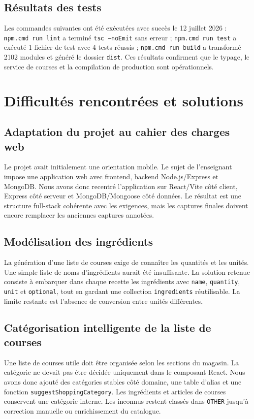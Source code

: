 \documentclass[12pt,a4paper]{report}
\begin{document}
\section{Résultats des tests}
Les commandes suivantes ont été exécutées avec succès le 12 juillet 2026 : \texttt{npm.cmd run lint} a terminé \texttt{tsc --noEmit} sans erreur ; \texttt{npm.cmd run test} a exécuté 1 fichier de test avec 4 tests réussis ; \texttt{npm.cmd run build} a transformé 2102 modules et généré le dossier \texttt{dist}. Ces résultats confirment que le typage, le service de courses et la compilation de production sont opérationnels.

\chapter{Difficultés rencontrées et solutions}
\section{Adaptation du projet au cahier des charges web}
Le projet avait initialement une orientation mobile. Le sujet de l'enseignant impose une application web avec frontend, backend Node.js/Express et MongoDB. Nous avons donc recentré l'application sur React/Vite côté client, Express côté serveur et MongoDB/Mongoose côté données. Le résultat est une structure full-stack cohérente avec les exigences, mais les captures finales doivent encore remplacer les anciennes captures annotées.

\section{Modélisation des ingrédients}
La génération d'une liste de courses exige de connaître les quantités et les unités. Une simple liste de noms d'ingrédients aurait été insuffisante. La solution retenue consiste à embarquer dans chaque recette les ingrédients avec \texttt{name}, \texttt{quantity}, \texttt{unit} et \texttt{optional}, tout en gardant une collection \texttt{ingredients} réutilisable. La limite restante est l'absence de conversion entre unités différentes.

\section{Catégorisation intelligente de la liste de courses}
Une liste de courses utile doit être organisée selon les sections du magasin. La catégorie ne devait pas être décidée uniquement dans le composant React. Nous avons donc ajouté des catégories stables côté domaine, une table d'alias et une fonction \texttt{suggestShoppingCategory}. Les ingrédients et articles de courses conservent une catégorie interne. Les inconnus restent classés dans \texttt{OTHER} jusqu'à correction manuelle ou enrichissement du catalogue.
\end{document}
